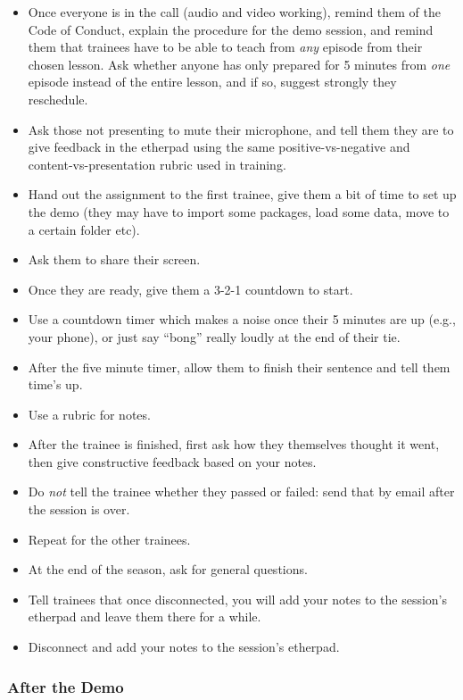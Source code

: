 \begin{itemize}
\item
  Once everyone is in the call (audio and video working), remind them of
  the Code of Conduct, explain the procedure for the demo session, and
  remind them that trainees have to be able to teach from \emph{any}
  episode from their chosen lesson. Ask whether anyone has only prepared
  for 5 minutes from \emph{one} episode instead of the entire lesson,
  and if so, suggest strongly they reschedule.
\item
  Ask those not presenting to mute their microphone, and tell them they
  are to give feedback in the etherpad using the same
  positive-vs-negative and content-vs-presentation rubric used in
  training.
\item
  Hand out the assignment to the first trainee, give them a bit of time
  to set up the demo (they may have to import some packages, load some
  data, move to a certain folder etc).
\item
  Ask them to share their screen.
\item
  Once they are ready, give them a 3-2-1 countdown to start.
\item
  Use a countdown timer which makes a noise once their 5 minutes are up
  (e.g., your phone), or just say ``bong'' really loudly at the end of
  their tie.
\item
  After the five minute timer, allow them to finish their sentence and
  tell them time's up.
\item
  Use a rubric for notes.
\item
  After the trainee is finished, first ask how they themselves thought
  it went, then give constructive feedback based on your notes.
\item
  Do \emph{not} tell the trainee whether they passed or failed: send
  that by email after the session is over.
\item
  Repeat for the other trainees.
\item
  At the end of the season, ask for general questions.
\item
  Tell trainees that once disconnected, you will add your notes to the
  session's etherpad and leave them there for a while.
\item
  Disconnect and add your notes to the session's etherpad.
\end{itemize}

\subsubsection{After the Demo}\label{after-the-demo}

